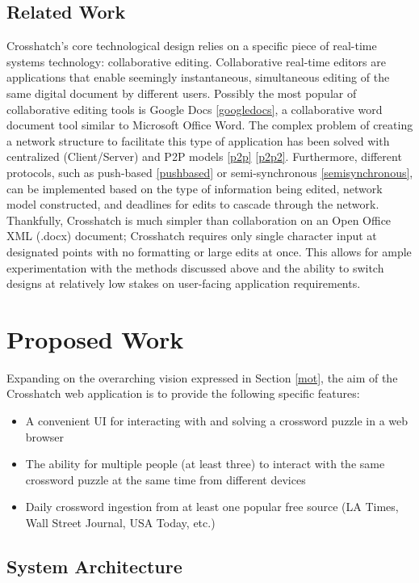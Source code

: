 \documentclass{article}
\begin{document}
\subsection{Related Work}
Crosshatch's core technological design relies on a specific piece of real-time systems technology: collaborative editing.
Collaborative real-time editors are applications that enable seemingly instantaneous, simultaneous editing 
of the same digital document by different users.
Possibly the most popular of collaborative editing tools is Google Docs \ref{googledocs}, a collaborative
word document tool similar to Microsoft Office Word.
The complex problem of creating a network structure to facilitate this type of application has been solved with centralized (Client/Server)
and P2P models \ref{p2p} \ref{p2p2}.
Furthermore, different protocols, such as push-based \ref{pushbased} or semi-synchronous \ref{semisynchronous}, can be implemented based on the type of information being edited,
network model constructed, and deadlines for edits to cascade through the network.
Thankfully, Crosshatch is much simpler than collaboration on an Open Office XML (.docx) document; Crosshatch requires only
single character input at designated points with no formatting or large edits at once. 
This allows for ample experimentation with the methods discussed above and the ability to switch designs 
at relatively low stakes on user-facing application requirements. 

\section{Proposed Work}
Expanding on the overarching vision expressed in Section \ref{mot}, the aim of the Crosshatch web application is to provide the following
specific features:
\begin{itemize}
  \item A convenient UI for interacting with and solving a crossword puzzle in a web browser
  \item The ability for multiple people (at least three) to interact with the same crossword puzzle at the same time from different devices
  \item Daily crossword ingestion from at least one popular free source (LA Times, Wall Street Journal, USA Today, etc.)
\end{itemize}

\subsection{System Architecture}
\end{document}
